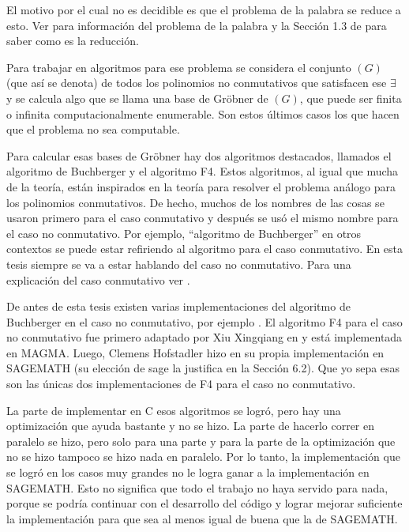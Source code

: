 \documentclass[12pt]{report}
\theoremstyle{customstyle}
\theoremstyle{factstyle}
\newcommand\cpp{C\nolinebreak[4]\hspace{-.05em}\raisebox{.4ex}{\relsize{-3}{\textbf{++}}}\xspace}
\begin{document}
El motivo por el cual no es decidible es que el problema de la palabra se reduce a esto. Ver \cite{web:wiki:WordPproblem} para información del problema de la palabra y la Sección 1.3 de \cite{article:MORA1994131} para saber como es la reducción.

Para trabajar en algoritmos para ese problema se considera el conjunto $(G)$ (que así se denota) de todos los polinomios no conmutativos que satisfacen ese $∃$ y se calcula algo que se llama una base de Gröbner de $(G)$, que puede ser finita o infinita computacionalmente enumerable. Son estos últimos casos los que hacen que el problema no sea computable. %

Para calcular esas bases de Gröbner hay dos algoritmos destacados, llamados el algoritmo de Buchberger y el algoritmo F4. Estos algoritmos, al igual que mucha de la teoría, están inspirados en la teoría para resolver el problema análogo para los polinomios conmutativos. De hecho, muchos de los nombres de las cosas se usaron primero para el caso conmutativo y después se usó el mismo nombre para el caso no conmutativo. Por ejemplo, ``algoritmo de Buchberger'' en otros contextos se puede estar refiriendo al algoritmo para el caso conmutativo. En esta tesis siempre se va a estar hablando del caso no conmutativo. Para una explicación del caso conmutativo ver \cite{book:ideals-varieties-algorithms}.

De antes de esta tesis existen varias implementaciones del algoritmo de Buchberger en el caso no conmutativo, por ejemplo \cite{lib:GBNP, lib:DGPS, lib:NCAlgebra}. El algoritmo F4 para el caso no conmutativo fue primero adaptado por Xiu Xingqiang en \cite{phdthesis:XiuXingqiang12} y está implementada en MAGMA. Luego, Clemens Hofstadler hizo en \cite{thesis:Hof20} su propia implementación en SAGEMATH (su elección de sage la justifica en la Sección 6.2). Que yo sepa esas son las únicas dos implementaciones de F4 para el caso no conmutativo.

La parte de implementar en \cpp esos algoritmos se logró, pero hay una optimización que ayuda bastante y no se hizo. La parte de hacerlo correr en paralelo se hizo, pero solo para una parte y para la parte de la optimización que no se hizo tampoco se hizo nada en paralelo. Por lo tanto, la implementación que se logró en los casos muy grandes no le logra ganar a la implementación en SAGEMATH. Esto no significa que todo el trabajo no haya servido para nada, porque se podría continuar con el desarrollo del código y lograr mejorar suficiente la implementación para que sea al menos igual de buena que la de SAGEMATH.
\end{document}

